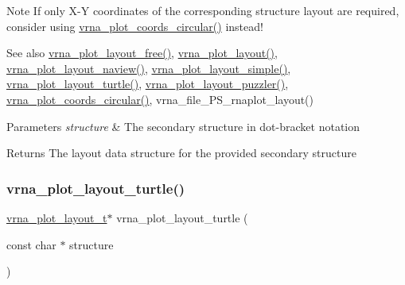 \begin{DoxyNote}{Note}
If only X-\/Y coordinates of the corresponding structure layout are required, consider using \mbox{\hyperlink{group__plot__layout__utils_ga47ff1fd92e9658361a758fdb03122911}{vrna\+\_\+plot\+\_\+coords\+\_\+circular()}} instead!
\end{DoxyNote}
\begin{DoxySeeAlso}{See also}
\mbox{\hyperlink{group__plot__layout__utils_ga996128730020a2d7a7368b4248195931}{vrna\+\_\+plot\+\_\+layout\+\_\+free()}}, \mbox{\hyperlink{group__plot__layout__utils_ga7953b759eada86c61b0a4aebe0dc67d1}{vrna\+\_\+plot\+\_\+layout()}}, \mbox{\hyperlink{group__plot__layout__utils_gab0e886afe200db9323e4e65d44738177}{vrna\+\_\+plot\+\_\+layout\+\_\+naview()}}, \mbox{\hyperlink{group__plot__layout__utils_ga8b09019a429c7c2447be94901c7ed658}{vrna\+\_\+plot\+\_\+layout\+\_\+simple()}}, \mbox{\hyperlink{group__plot__layout__utils_ga4ecd3401e22933a44bf31d14320e59b1}{vrna\+\_\+plot\+\_\+layout\+\_\+turtle()}}, \mbox{\hyperlink{group__plot__layout__utils_ga57f815d56c8c083c016381213f581f1e}{vrna\+\_\+plot\+\_\+layout\+\_\+puzzler()}}, \mbox{\hyperlink{group__plot__layout__utils_ga47ff1fd92e9658361a758fdb03122911}{vrna\+\_\+plot\+\_\+coords\+\_\+circular()}}, vrna\+\_\+file\+\_\+\+P\+S\+\_\+rnaplot\+\_\+layout()
\end{DoxySeeAlso}

\begin{DoxyParams}{Parameters}
{\em structure} & The secondary structure in dot-\/bracket notation \\
\hline
\end{DoxyParams}
\begin{DoxyReturn}{Returns}
The layout data structure for the provided secondary structure 
\end{DoxyReturn}
\mbox{\label{group__plot__layout__utils_ga4ecd3401e22933a44bf31d14320e59b1}} 
\subsubsection{\texorpdfstring{vrna\_plot\_layout\_turtle()}{vrna\_plot\_layout\_turtle()}}
{\footnotesize\ttfamily \mbox{\hyperlink{group__plot__layout__utils_gac986fe092abc2a6a93ceb5141e4dd28b}{vrna\+\_\+plot\+\_\+layout\+\_\+t}}$\ast$ vrna\+\_\+plot\+\_\+layout\+\_\+turtle (\begin{DoxyParamCaption}\item[{const char $\ast$}]{structure }\end{DoxyParamCaption})}



